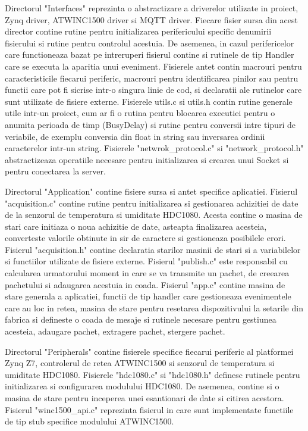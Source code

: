 Directorul "Interfaces" reprezinta o abstractizare a driverelor utilizate in proiect, Zynq driver, ATWINC1500 driver si MQTT driver. Fiecare fisier sursa din acest director 
contine rutine pentru initializarea perifericului specific denumirii fisierului si rutine pentru controlul acestuia. De asemenea, in cazul perifericelor care functioneaza 
bazat pe intreruperi fisierul contine si rutinele de tip Handler care se executa la aparitia unui eveniment. Fisierele antet contin macrouri pentru caracteristicile 
fiecarui periferic, macrouri pentru identificarea pinilor sau pentru functii care pot fi sicrise intr-o singura linie de cod, si declaratii ale rutinelor care sunt 
utilizate de fisiere externe. Fisierele utils.c si utils.h contin rutine generale utile intr-un proiect, cum ar fi o rutina pentru blocarea executiei pentru o anumita 
perioada de timp (BusyDelay) si rutine pentru conversii intre tipuri de veriabile, de exemplu conversia din float in string sau inversarea ordinii caracterelor intr-un 
string. Fisierele "netwrok\_protocol.c" si "network\_protocol.h" abstractizeaza operatiile necesare pentru initializarea si crearea unui Socket si pentru conectarea 
la server.

Directorul "Application" contine fisiere sursa si antet specifice aplicatiei. Fisierul "acquisition.c" contine rutine pentru initializarea si gestionarea achizitiei 
de date de la senzorul de temperatura si umiditate HDC1080. Acesta contine o masina de stari care initiaza o noua achizitie de date, asteapta finalizarea acesteia, 
converteste valorile obtinute in sir de caractere si gestioneaza posibilele erori. Fisierul "acquisition.h" contine declaratia starilor masinii de stari si a 
variabilelor si functiilor utilizate de fisiere externe. Fisierul "publish.c" este responsabil cu calcularea urmatorului moment in care se va transmite un pachet,
de creearea pachetului si adaugarea acestuia in coada. Fisierul "app.c" contine masina de stare generala a aplicatiei, functii de tip handler care gestioneaza 
evenimentele care au loc in retea, masina de stare pentru resetarea dispozitivului la setarile din fabrica si defineste o coada de mesaje si rutinele necesare 
pentru gestiunea acesteia, adaugare pachet, extragere pachet, stergere pachet. 

Directorul "Peripherals" contine fisierele specifice fiecarui periferic al platformei Zynq Z7, controlerul de retea ATWINC1500 si senzorul de temperatura si 
umiditate HDC1080. Fisierele "hdc1080.c" si "hdc1080.h" definesc rutinele pentru initializarea si configurarea modulului HDC1080. De asemenea, contine si o masina 
de stare pentru inceperea unei esantionari de date si citirea acestora. Fisierul "winc1500\_api.c" reprezinta fisierul in care sunt implementate functiile de tip 
stub specifice modulului ATWINC1500.

